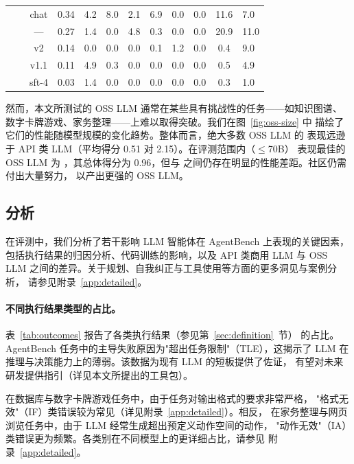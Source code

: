 \begin{table}[t]
\begin{tabular}{ll c c *{4}{c} *{3}{c}}
        &            & chat & 0.34 &  4.2 &  8.0 &  2.1 &  6.9 &  0.0 &  0.0 & 11.6 &  7.0 \\
        &          & ---  & 0.27 &  1.4 &  0.0 &  4.8 &  0.3 &  0.0 &  0.0 & 20.9 & 11.0 \\
        &             & v2   & 0.14 &  0.0 &  0.0 &  0.0 &  0.1 &  1.2 &  0.0 &  0.4 &  9.0 \\
        &            & v1.1 & 0.11 &  4.9 &  0.3 &  0.0 &  0.0 &  0.0 &  0.0 &  0.5 &  4.9 \\
        &             & sft-4& 0.03 &  1.4 &  0.0 &  0.0 &  0.0 &  0.0 &  0.0 &  0.3 &  1.0 \\
        \bottomrule
    \end{tabular}
\end{table}

然而，本文所测试的 OSS LLM 通常在某些具有挑战性的任务——如知识图谱、
数字卡牌游戏、家务整理——上难以取得突破。我们在图~\ref{fig:oss-size} 中
描绘了它们的性能随模型规模的变化趋势。整体而言，绝大多数 OSS LLM 的
表现远逊于 API 类 LLM（平均得分 0.51 对 2.15）。在评测范围内（$\leq$70B）
表现最佳的 OSS LLM 为 ，其总体得分为 0.96，但与
 之间仍存在明显的性能差距。社区仍需付出大量努力，
以产出更强的 OSS LLM。

\subsection{分析}

在评测中，我们分析了若干影响 LLM 智能体在 AgentBench 上表现的关键因素，
包括执行结果的归因分析、代码训练的影响，以及 API 类商用 LLM 与 OSS LLM
之间的差异。关于规划、自我纠正与工具使用等方面的更多洞见与案例分析，
请参见附录~\ref{app:detailed}。

\paragraph{不同执行结果类型的占比。}
表~\ref{tab:outcomes} 报告了各类执行结果（参见第~\ref{sec:definition}~节）
的占比。AgentBench 任务中的主导失败原因为"超出任务限制"（TLE），这揭示了
LLM 在推理与决策能力上的薄弱。该数据为现有 LLM 的短板提供了佐证，
有望对未来研发提供指引（详见本文所提出的工具包）。

在数据库与数字卡牌游戏任务中，由于任务对输出格式的要求非常严格，
"格式无效"（IF）类错误较为常见（详见附录~\ref{app:detailed}）。相反，
在家务整理与网页浏览任务中，由于 LLM 经常生成超出预定义动作空间的动作，
"动作无效"（IA）类错误更为频繁。各类别在不同模型上的更详细占比，请参见
附录~\ref{app:detailed}。


